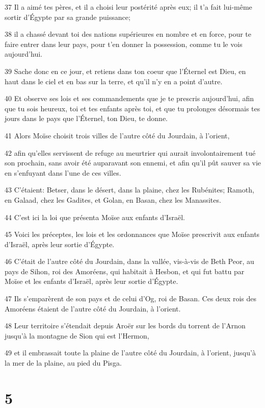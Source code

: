 \par 37 Il a aimé tes pères, et il a choisi leur postérité après eux; il t'a fait lui-même sortir d'Égypte par sa grande puissance;
\par 38 il a chassé devant toi des nations supérieures en nombre et en force, pour te faire entrer dans leur pays, pour t'en donner la possession, comme tu le vois aujourd'hui.
\par 39 Sache donc en ce jour, et retiens dans ton coeur que l'Éternel est Dieu, en haut dans le ciel et en bas sur la terre, et qu'il n'y en a point d'autre.
\par 40 Et observe ses lois et ses commandements que je te prescris aujourd'hui, afin que tu sois heureux, toi et tes enfants après toi, et que tu prolonges désormais tes jours dans le pays que l'Éternel, ton Dieu, te donne.
\par 41 Alors Moïse choisit trois villes de l'autre côté du Jourdain, à l'orient,
\par 42 afin qu'elles servissent de refuge au meurtrier qui aurait involontairement tué son prochain, sans avoir été auparavant son ennemi, et afin qu'il pût sauver sa vie en s'enfuyant dans l'une de ces villes.
\par 43 C'étaient: Betser, dans le désert, dans la plaine, chez les Rubénites; Ramoth, en Galaad, chez les Gadites, et Golan, en Basan, chez les Manassites.
\par 44 C'est ici la loi que présenta Moïse aux enfants d'Israël.
\par 45 Voici les préceptes, les lois et les ordonnances que Moïse prescrivit aux enfants d'Israël, après leur sortie d'Égypte.
\par 46 C'était de l'autre côté du Jourdain, dans la vallée, vis-à-vis de Beth Peor, au pays de Sihon, roi des Amoréens, qui habitait à Hesbon, et qui fut battu par Moïse et les enfants d'Israël, après leur sortie d'Égypte.
\par 47 Ils s'emparèrent de son pays et de celui d'Og, roi de Basan. Ces deux rois des Amoréens étaient de l'autre côté du Jourdain, à l'orient.
\par 48 Leur territoire s'étendait depuis Aroër sur les bords du torrent de l'Arnon jusqu'à la montagne de Sion qui est l'Hermon,
\par 49 et il embrassait toute la plaine de l'autre côté du Jourdain, à l'orient, jusqu'à la mer de la plaine, au pied du Pisga.

\chapter{5}

